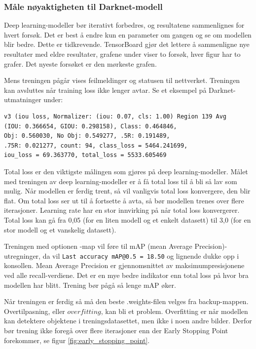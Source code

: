 \subsubsection{Måle nøyaktigheten til Darknet-modell}

Deep learning-modeller bør iterativt forbedres, og resultatene sammenlignes for hvert forsøk. Det er best å endre kun en parameter om gangen og se om modellen blir bedre. Dette er tidkrevende. TensorBoard gjør det lettere å sammenligne nye resultater med eldre resultater, grafene under viser to forsøk, hver figur har to grafer. Det nyeste forsøket er den mørkeste grafen.

Mens treningen pågår vises feilmeldinger og statusen til nettverket. Treningen kan avsluttes når training loss ikke lenger avtar. Se et eksempel på Darknet-utmatninger under:

\begin{verbatim}
v3 (iou loss, Normalizer: (iou: 0.07, cls: 1.00) Region 139 Avg
(IOU: 0.366654, GIOU: 0.298158), Class: 0.464846,
Obj: 0.560030, No Obj: 0.549277, .5R: 0.191489,
.75R: 0.021277, count: 94, class_loss = 5464.241699,
iou_loss = 69.363770, total_loss = 5533.605469 
\end{verbatim}

Total loss er den viktigste målingen som gjøres på deep learning-modeller. Målet med treningen av deep learning-modeller er å få total loss til å bli så lav som mulig. Når modellen er ferdig trent, så vil vanligvis total loss konvergere, den blir flat. Om total loss ser ut til å fortsette å avta, så bør modellen trenes over flere iterasjoner. Learning rate har en stor innvirking på når total loss konvergerer. Total loss kan gå fra 0,05 (for en liten modell og et enkelt datasett) til 3,0 (for en stor modell og et vanskelig datasett). \cite{Bochkovskiy 2020}

Treningen med optionen -map vil føre til mAP (mean Average Precision)-utregninger, da vil \texttt{Last accuracy mAP@0.5 = 18.50} og lignende dukke opp i konsollen. Mean Average Precision er gjennomsnittet av maksimumpresisjonene ved alle recall-verdiene. Det er en mye bedre indikator enn total loss på hvor bra modellen har blitt. Trening bør pågå så lenge mAP øker. \cite{Bochkovskiy 2020}%

Når treningen er ferdig så må den beste .weights-filen velges fra backup-mappen. Overtilpasning, eller $overfitting$, kan bli et problem. Overfitting er når modellen kan detektere objektene i treningsdatasettet, men ikke i noen andre bilder. Derfor bør trening ikke foregå over flere iterasjoner enn der Early Stopping Point forekommer, se figur \ref{fig:early_stopping_point}. \cite{Bochkovskiy 2020}

